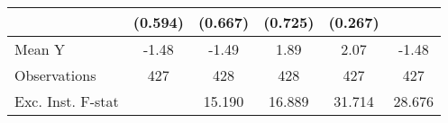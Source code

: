 {\begin{tabular}{l*{5}{c}}
            &     (0.594)         &     (0.667)         &     (0.725)         &     (0.267)         &                     \\
\midrule
Mean Y      &       -1.48         &       -1.49         &        1.89         &        2.07         &       -1.48         \\
Observations&         427         &         428         &         428         &         427         &         427         \\
Exc. Inst. F-stat&                     &      15.190         &      16.889         &      31.714         &      28.676         \\
\bottomrule
\end{tabular}
}
